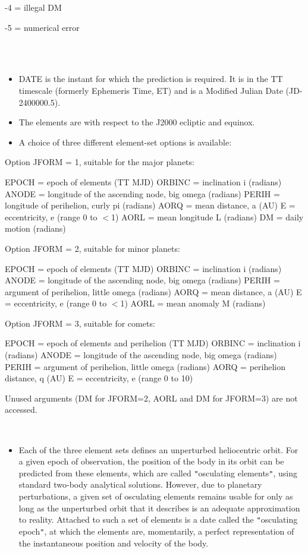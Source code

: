 \documentclass[twoside,11pt]{article}
\renewcommand{\_}{\texttt{\symbol{95}}}
\newcommand{\sstnotes}[1]{\goodbreak \item[Notes:] \mbox{} \\[1.3ex] #1}
\newcommand{\sstitemlist}[1]{
  \mbox{} \\
  \vspace{-3.5ex}
  \begin{itemize}
     #1
  \end{itemize}
}
\newcommand{\sstitem}{\item}
\newcommand{\sstnotes}[1]{\item[Notes:] #1 }
\newcommand{\sstitemlist}[1]{
      \begin{itemize}
         #1
      \end{itemize}
      \\
   }
\newcommand{\sstitem}{\item}
\begin{document}
{{{{            \sstitem
                  -4 = illegal DM

            \sstitem
                  -5 = numerical error
         }
      }
   }
   \sstnotes{
      \sstitemlist{

         \sstitem
         DATE is the instant for which the prediction is required.  It is
           in the TT timescale (formerly Ephemeris Time, ET) and is a
           Modified Julian Date (JD-2400000.5).

         \sstitem
         The elements are with respect to the J2000 ecliptic and equinox.

         \sstitem
         A choice of three different element-set options is available:

      }
        Option JFORM = 1, suitable for the major planets:

          EPOCH  = epoch of elements (TT MJD)
          ORBINC = inclination i (radians)
          ANODE  = longitude of the ascending node, big omega (radians)
          PERIH  = longitude of perihelion, curly pi (radians)
          AORQ   = mean distance, a (AU)
          E      = eccentricity, e (range 0 to $<$1)
          AORL   = mean longitude L (radians)
          DM     = daily motion (radians)

        Option JFORM = 2, suitable for minor planets:

          EPOCH  = epoch of elements (TT MJD)
          ORBINC = inclination i (radians)
          ANODE  = longitude of the ascending node, big omega (radians)
          PERIH  = argument of perihelion, little omega (radians)
          AORQ   = mean distance, a (AU)
          E      = eccentricity, e (range 0 to $<$1)
          AORL   = mean anomaly M (radians)

        Option JFORM = 3, suitable for comets:

          EPOCH  = epoch of elements and perihelion (TT MJD)
          ORBINC = inclination i (radians)
          ANODE  = longitude of the ascending node, big omega (radians)
          PERIH  = argument of perihelion, little omega (radians)
          AORQ   = perihelion distance, q (AU)
          E      = eccentricity, e (range 0 to 10)

        Unused arguments (DM for JFORM=2, AORL and DM for JFORM=3) are not
        accessed.
      \sstitemlist{

         \sstitem
         Each of the three element sets defines an unperturbed heliocentric
           orbit.  For a given epoch of observation, the position of the body
           in its orbit can be predicted from these elements, which are
           called {\tt "}osculating elements{\tt "}, using standard two-body analytical
           solutions.  However, due to planetary perturbations, a given set
           of osculating elements remains usable for only as long as the
           unperturbed orbit that it describes is an adequate approximation
           to reality.  Attached to such a set of elements is a date called
           the {\tt "}osculating epoch{\tt "}, at which the elements are, momentarily,
           a perfect representation of the instantaneous position and
           velocity of the body.

}}}
\end{document}
